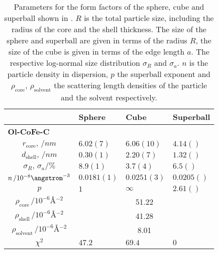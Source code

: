 \documentclass[\main/dresen_thesis.tex]{subfiles}
\begin{document}
  \begin{table}[ht]
    \centering
    \caption{\label{tab:monolayers:nanoparticle:saxs:oleateCoreShell}Parameters for the form factors of the sphere, cube and superball shown in .
    $R$ is the total particle size, including the radius of the core and the shell thickness. The size of the sphere and superball are given in terms of the radius $R$, the size of the cube is given in terms of the edge length $a$. The respective log-normal size distribution $\sigma_R$ and $\sigma_a$. $n$ is the particle density in dispersion, $p$ the superball exponent and $\rho_\mathrm{core}$, $\rho_\mathrm{solvent}$ the scattering length densities of the particle and the solvent respectively.}
    \begin{tabular}{ c | l | l | l }
        & \textbf{Sphere} & \textbf{Cube} & \textbf{Superball}\\
      \hline
        \multicolumn{4}{l}{\textbf{Ol-CoFe-C}}\\
      \hline
      \rule{0pt}{2ex} $r_\mathrm{core} , \, / \unit{nm}$    & $6.02(7)$     & $6.06(10)$   & $4.14()$\\
      \rule{0pt}{2ex} $d_\mathrm{shell} , \, / \unit{nm}$   & $0.30(1)$     & $2.20(7)$    & $1.32()$\\
      \rule{0pt}{2ex} $\sigma_R , \, \sigma_a / \unit{\%}$           & $8.9(1)$       & $3.7(4)$    & $6.5()$\\
      \rule{0pt}{2ex} $n \, / 10^{-8} \angstrom^{-3}$     & $0.0181(1)$    & $0.0251(3)$ & $0.0205()$\\
      \rule{0pt}{2ex} $p$                                 & $1$            & $\infty$    & $2.61()$\\
      \hline
      \rule{0pt}{2ex} $\rho_\mathrm{core}    \, / \unit{10^{-6} \angstrom^{-2}}$     & \multicolumn{3}{c}{51.22}\\
      \rule{0pt}{2ex} $\rho_\mathrm{shell}    \, / \unit{10^{-6} \angstrom^{-2}}$    & \multicolumn{3}{c}{41.28}\\
      \rule{0pt}{2ex} $\rho_\mathrm{solvent} \, / \unit{10^{-6} \angstrom^{-2}}$     & \multicolumn{3}{c}{8.01}\\
      \hline
      \rule{0pt}{2ex} $\chi^2$                            & $47.2$        & $69.4$       & $0$\\
      \hline
    \end{tabular}
  \end{table}
\end{document}
